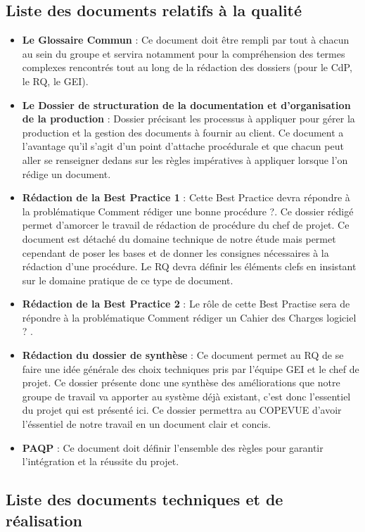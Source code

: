 \documentclass[a4paper]{article}
\begin{document}
\subsection{Liste des documents relatifs à la qualité}

\begin{itemize}
\item \textbf{Le Glossaire Commun} : Ce document doit être rempli par tout à chacun au sein du groupe et servira notamment pour la compréhension des termes complexes rencontrés tout au long de la rédaction des dossiers (pour le CdP, le RQ, le GEI).
\item \textbf{Le Dossier de structuration de la documentation et d'organisation de la production} : Dossier précisant les processus à appliquer pour gérer la production et la gestion des documents à fournir au client. Ce document a l'avantage qu'il s'agit d'un point d'attache procédurale et que chacun peut aller se renseigner dedans sur les règles impératives à appliquer lorsque l'on rédige un document.
\item \textbf{Rédaction de la Best Practice 1} : Cette Best Practice devra répondre à la problématique \og Comment rédiger une bonne procédure ?\fg. Ce dossier rédigé permet d'amorcer le travail de rédaction de procédure du chef de projet. Ce document est détaché du domaine technique de notre étude mais permet cependant de poser les bases et de donner les consignes nécessaires à la rédaction d'une procédure. Le RQ devra définir les éléments clefs en insistant sur le domaine pratique de ce type de document.
\item \textbf{Rédaction de la Best Practice 2} : Le rôle de cette Best Practise sera de répondre à la problématique \og Comment rédiger un Cahier des Charges logiciel ? \fg.
\item \textbf{Rédaction du dossier de synthèse} : Ce document permet au RQ de se faire une idée générale des choix techniques pris par l'équipe GEI et le chef de projet. Ce dossier présente donc une synthèse des améliorations que notre groupe de travail va apporter au système déjà existant, c'est donc l'essentiel du projet qui est présenté ici. Ce dossier permettra au COPEVUE d'avoir l'éssentiel de notre travail en un document clair et concis.
\item \textbf{PAQP} : Ce document doit définir l'ensemble des règles pour garantir l'intégration et la réussite du projet.
\end{itemize}

\subsection{Liste des documents techniques et de réalisation}
\end{document}
